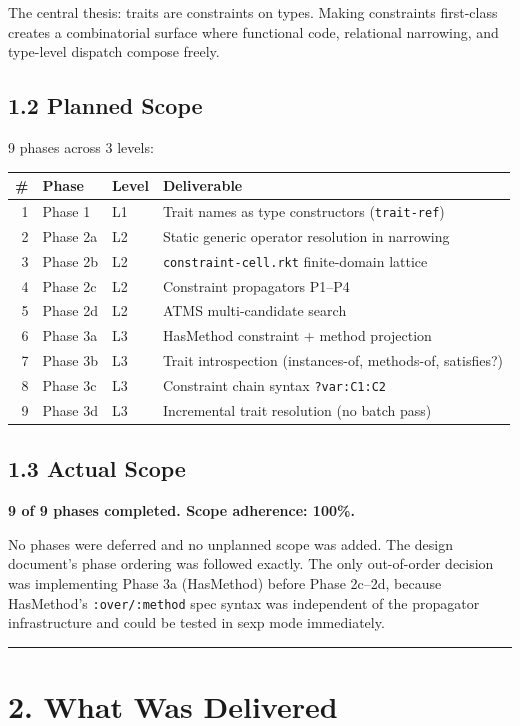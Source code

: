 \documentclass[11pt]{article}
\begin{document}
The central thesis: traits are constraints on types. Making constraints first-class
creates a combinatorial surface where functional code, relational narrowing, and
type-level dispatch compose freely.
\subsection{1.2 Planned Scope}
\label{sec:org975de49}

9 phases across 3 levels:

\begin{center}
\begin{tabular}{rlll}
\# & Phase & Level & Deliverable\\
\hline
1 & Phase 1 & L1 & Trait names as type constructors (\texttt{trait-ref})\\
2 & Phase 2a & L2 & Static generic operator resolution in narrowing\\
3 & Phase 2b & L2 & \texttt{constraint-cell.rkt} finite-domain lattice\\
4 & Phase 2c & L2 & Constraint propagators P1–P4\\
5 & Phase 2d & L2 & ATMS multi-candidate search\\
6 & Phase 3a & L3 & HasMethod constraint + method projection\\
7 & Phase 3b & L3 & Trait introspection (instances-of, methods-of, satisfies?)\\
8 & Phase 3c & L3 & Constraint chain syntax \texttt{?var:C1:C2}\\
9 & Phase 3d & L3 & Incremental trait resolution (no batch pass)\\
\end{tabular}
\end{center}
\subsection{1.3 Actual Scope}
\label{sec:org09d1193}

\textbf{9 of 9 phases completed. Scope adherence: 100\%.}

No phases were deferred and no unplanned scope was added. The design document's
phase ordering was followed exactly. The only out-of-order decision was implementing
Phase 3a (HasMethod) before Phase 2c–2d, because HasMethod's \texttt{:over/:method} spec
syntax was independent of the propagator infrastructure and could be tested in sexp
mode immediately.

\noindent\rule{\textwidth}{0.5pt}
\section{2. What Was Delivered}
\label{sec:orgabc2f95}
\end{document}
